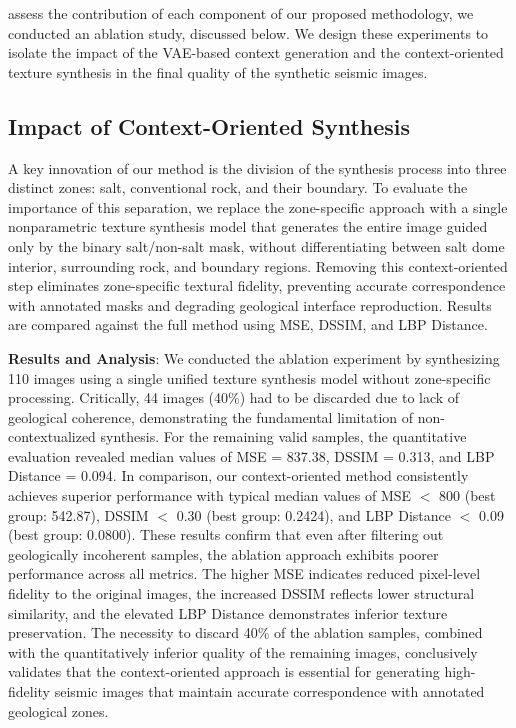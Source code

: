 \documentclass{ieeeaccess}
\begin{document}
 assess the contribution of each component of our proposed methodology, we conducted an ablation study, discussed below. We design these experiments to isolate the impact of the VAE-based context generation and the context-oriented texture synthesis in the final quality of the synthetic seismic images.

\subsection{Impact of Context-Oriented Synthesis}

A key innovation of our method is the division of the synthesis process into three distinct zones: salt, conventional rock, and their boundary. To evaluate the importance of this separation, we replace the zone-specific approach with a single nonparametric texture synthesis model that generates the entire image guided only by the binary salt/non-salt mask, without differentiating between salt dome interior, surrounding rock, and boundary regions. Removing this context-oriented step eliminates zone-specific textural fidelity, preventing accurate correspondence with annotated masks and degrading geological interface reproduction. Results are compared against the full method using MSE, DSSIM, and LBP Distance.

\textbf{Results and Analysis}: We conducted the ablation experiment by synthesizing 110 images using a single unified texture synthesis model without zone-specific processing. Critically, 44 images (40\%) had to be discarded due to lack of geological coherence, demonstrating the fundamental limitation of non-contextualized synthesis. For the remaining valid samples, the quantitative evaluation revealed median values of MSE = 837.38, DSSIM = 0.313, and LBP Distance = 0.094. In comparison, our context-oriented method consistently achieves superior performance with typical median values of MSE $<$ 800 (best group: 542.87), DSSIM $<$ 0.30 (best group: 0.2424), and LBP Distance $<$ 0.09 (best group: 0.0800). These results confirm that even after filtering out geologically incoherent samples, the ablation approach exhibits poorer performance across all metrics. The higher MSE indicates reduced pixel-level fidelity to the original images, the increased DSSIM reflects lower structural similarity, and the elevated LBP Distance demonstrates inferior texture preservation. The necessity to discard 40\% of the ablation samples, combined with the quantitatively inferior quality of the remaining images, conclusively validates that the context-oriented approach is essential for generating high-fidelity seismic images that maintain accurate correspondence with annotated geological zones.
\end{document}
